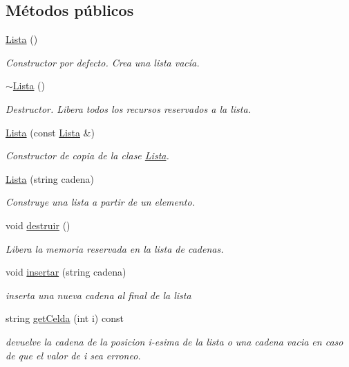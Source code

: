 \subsection*{Métodos públicos}
\begin{DoxyCompactItemize}
\item 
\hyperlink{class_lista_a1f668b36909182ef1360b48503529a31}{Lista} ()
\begin{DoxyCompactList}\small\item\em Constructor por defecto. Crea una lista vacía. \end{DoxyCompactList}\item 
\hyperlink{class_lista_a4d7394b2728a00ad8404965b2e15d096}{$\sim$\+Lista} ()
\begin{DoxyCompactList}\small\item\em Destructor. Libera todos los recursos reservados a la lista. \end{DoxyCompactList}\item 
\hyperlink{class_lista_a6a479a165fde4f0b9842d2b26f9fce75}{Lista} (const \hyperlink{class_lista}{Lista} \&)
\begin{DoxyCompactList}\small\item\em Constructor de copia de la clase \hyperlink{class_lista}{Lista}. \end{DoxyCompactList}\item 
\hyperlink{class_lista_adb33dfb3ac2cfef81f52af48afeef0a7}{Lista} (string cadena)
\begin{DoxyCompactList}\small\item\em Construye una lista a partir de un elemento. \end{DoxyCompactList}\item 
void \hyperlink{class_lista_a7b1f5c4b50044823f2746853bfaa5e15}{destruir} ()
\begin{DoxyCompactList}\small\item\em Libera la memoria reservada en la lista de cadenas. \end{DoxyCompactList}\item 
void \hyperlink{class_lista_a2cf31ee7be6ed41e9084efffb807aa5e}{insertar} (string cadena)
\begin{DoxyCompactList}\small\item\em inserta una nueva cadena al final de la lista \end{DoxyCompactList}\item 
string \hyperlink{class_lista_a69c0764aa81aca4543b2a9898d941f51}{get\+Celda} (int i) const 
\begin{DoxyCompactList}\small\item\em devuelve la cadena de la posicion i-\/esima de la lista o una cadena vacia en caso de que el valor de i sea erroneo. \end{DoxyCompactList}\item 

\end{DoxyCompactItemize}
